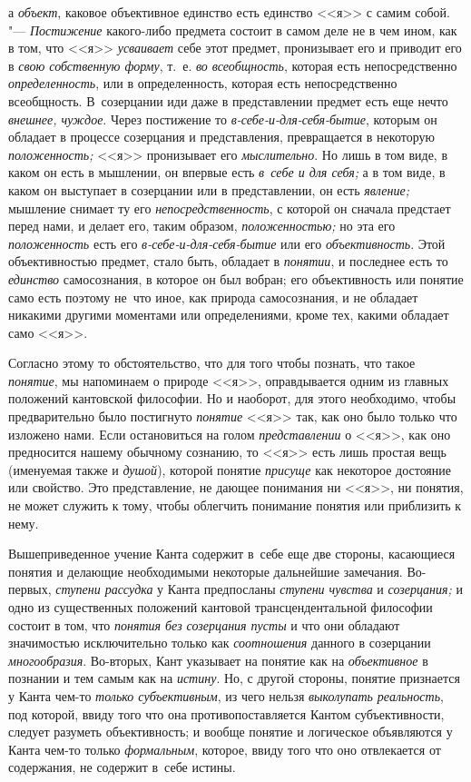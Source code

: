 а {\em объект}, каковое объективное единство есть единство <<я>> с самим собой. "---
{\em Постижение} какого-либо предмета состоит в самом деле не в чем ином, как
в том, что <<я>> {\em усваивает} себе этот предмет, пронизывает его и приводит его
в {\em свою собственную форму}, т.~е. {\em во всеобщность}, которая есть
непосредственно {\em определенность}, или в определенность, которая есть
непосредственно всеобщность. В~созерцании иди даже в представлении предмет
есть еще нечто {\em внешнее, чуждое}. Через постижение то
{\em в-себе-и-для-себя-бытие}, которым он обладает в процессе созерцания и
представления, превращается в некоторую {\em положенность;} <<я>> пронизывает
его {\em мыслительно}. Но лишь в том виде, в каком он есть в мышлении, он
впервые есть {\em в~себе и для себя;} а в том виде, в каком он выступает в
созерцании или в представлении, он есть {\em явление;} мышление снимает ту
его {\em непосредственность}, с которой он сначала предстает перед нами, и
делает его, таким образом, {\em положенностью;} но эта его {\em положенность}
есть его {\em в-себе-и-для-себя-бытие} или его {\em объективность}. Этой
объективностью предмет, стало быть, обладает в {\em понятии}, и последнее
есть то {\em единство} самосознания, в которое он был вобран; его
объективность или понятие само есть поэтому не~что иное, как природа
самосознания, и не обладает никакими другими моментами или определениями,
кроме тех, какими обладает само <<я>>.

Согласно этому то обстоятельство, что для того чтобы познать, что такое
{\em понятие}, мы напоминаем о природе <<я>>, оправдывается одним из главных
положений кантовской философии. Но и наоборот, для этого необходимо, чтобы
предварительно было постигнуто {\em понятие} <<я>> так, как оно было только что
изложено нами. Если остановиться на голом {\em представлении} о <<я>>, как оно
предносится нашему обычному сознанию, то <<я>> есть лишь простая вещь
(именуемая также и {\em душой}), которой понятие {\em присуще} как некоторое
достояние или свойство. Это представление, не дающее понимания ни <<я>>, ни
понятия, не может служить к тому, чтобы облегчить понимание понятия или
приблизить к нему.

Вышеприведенное учение Канта содержит в~себе еще две стороны,
касающиеся понятия и делающие необходимыми некоторые дальнейшие замечания.
Во-первых, {\em ступени рассудка} у Канта предпосланы {\em ступени чувства} и
{\em созерцания;} и одно из существенных положений кантовой трансцендентальной
философии состоит в том, что {\em понятия без созерцания
пусты} и что они обладают значимостью исключительно только
как {\em соотношения} данного в созерцании {\em многообразия}.
Во-вторых, Кант указывает на понятие как на {\em объективное}
в познании и тем самым как на {\em истину}. Но, с
другой стороны, понятие признается у Канта чем-то {\em только субъективным},
из чего нельзя {\em выколупать реальность},
под которой, ввиду того что она противопоставляется Кантом
субъективности, следует разуметь объективность; и вообще понятие и
логическое объявляются у Канта чем-то только {\em формальным}, которое,
ввиду того что оно отвлекается от содержания, не содержит в~себе истины.


